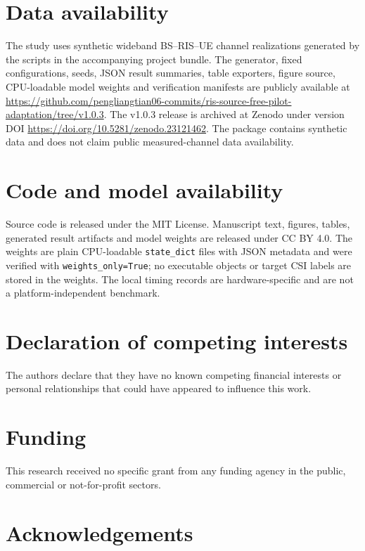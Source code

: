 \documentclass[10pt,twocolumn]{article}
\begin{document}
\section*{Data availability}

The study uses synthetic wideband BS--RIS--UE channel realizations generated by the scripts in the accompanying project bundle. The generator, fixed configurations, seeds, JSON result summaries, table exporters, figure source, CPU-loadable model weights and verification manifests are publicly available at \url{https://github.com/pengliangtian06-commits/ris-source-free-pilot-adaptation/tree/v1.0.3}. The v1.0.3 release is archived at Zenodo under version DOI \url{https://doi.org/10.5281/zenodo.23121462}. The package contains synthetic data and does not claim public measured-channel data availability.

\section*{Code and model availability}

Source code is released under the MIT License. Manuscript text, figures, tables, generated result artifacts and model weights are released under CC BY 4.0. The weights are plain CPU-loadable \texttt{state\_dict} files with JSON metadata and were verified with \texttt{weights\_only=True}; no executable objects or target CSI labels are stored in the weights. The local timing records are hardware-specific and are not a platform-independent benchmark.

\section*{Declaration of competing interests}

The authors declare that they have no known competing financial interests or personal relationships that could have appeared to influence this work.

\section*{Funding}

This research received no specific grant from any funding agency in the public, commercial or not-for-profit sectors.

\section*{Acknowledgements}
\end{document}
